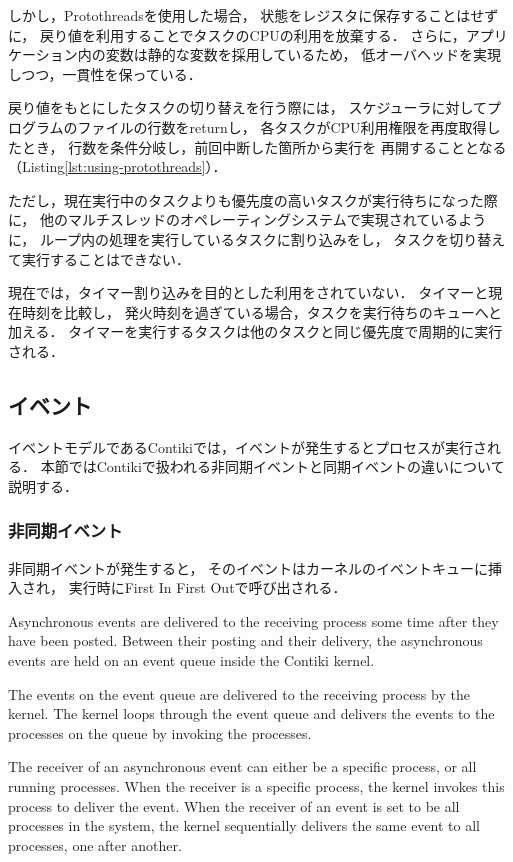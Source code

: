 しかし，Protothreadsを使用した場合，
状態をレジスタに保存することはせずに，
戻り値を利用することでタスクのCPUの利用を放棄する．
さらに，アプリケーション内の変数は静的な変数を採用しているため，
低オーバヘッドを実現しつつ，一貫性を保っている．

戻り値をもとにしたタスクの切り替えを行う際には，
スケジューラに対してプログラムのファイルの行数をreturnし，
各タスクがCPU利用権限を再度取得したとき，
行数を条件分岐し，前回中断した箇所から実行を
再開することとなる（Listing\ref{lst:using-protothreads}）．

ただし，現在実行中のタスクよりも優先度の高いタスクが実行待ちになった際に，
他のマルチスレッドのオペレーティングシステムで実現されているように，
ループ内の処理を実行しているタスクに割り込みをし，
タスクを切り替えて実行することはできない．

現在では，タイマー割り込みを目的とした利用をされていない．
タイマーと現在時刻を比較し，
発火時刻を過ぎている場合，タスクを実行待ちのキューへと加える．
タイマーを実行するタスクは他のタスクと同じ優先度で周期的に実行される．




\subsection{イベント}
イベントモデルであるContikiでは，イベントが発生するとプロセスが実行される．
本節ではContikiで扱われる非同期イベントと同期イベントの違いについて説明する．

\subsubsection{非同期イベント}

\vspace{0.5em}非同期イベントが発生すると，
そのイベントはカーネルのイベントキューに挿入され，
実行時にFirst In First Outで呼び出される．

Asynchronous events are delivered to the receiving process some time after they have been posted.
Between their posting and their delivery, 
the asynchronous events are held on an event queue inside the Contiki kernel.

The events on the event queue are delivered to the receiving process by the kernel.
The kernel loops through the event queue and 
delivers the events to the processes on the queue by invoking the processes.



The receiver of an asynchronous event can either be a specific process, or all running processes.
When the receiver is a specific process, the kernel invokes this process to deliver the event.
When the receiver of an event is set to be all processes in the system,
the kernel sequentially delivers the same event to all processes, 
one after another.

